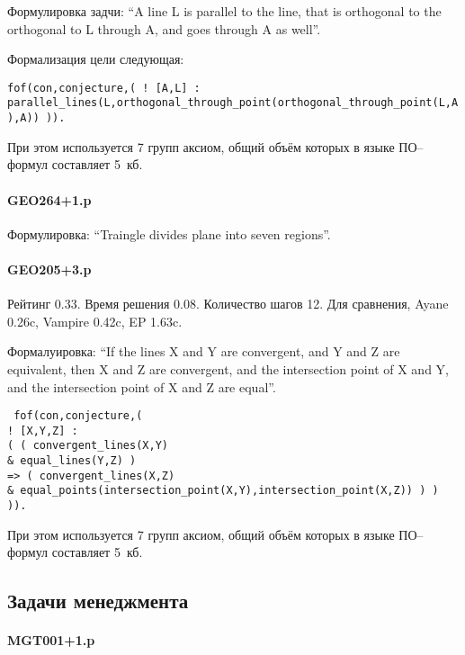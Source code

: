 Формулировка задчи: ``A line L is parallel to the line, that is orthogonal to the orthogonal to L through A, and goes through A as well''.

Формализация цели следующая:

\texttt{fof(con,conjecture,(
    ! [A,L] : parallel\_lines(L,orthogonal\_through\_point(orthogonal\_through\_point(L,A),A)) )).}

При этом используется 7 групп аксиом, общий объём которых в языке ПО--формул составляет 5~кб.

\paragraph{GEO264+1.p}

Формулировка: ``Traingle divides plane into seven regions''.

\paragraph{GEO205+3.p}
Рейтинг 0.33. Время решения 0.08. Количество шагов 12. Для сравнения, Ayane 0.26c, Vampire 0.42c, EP 1.63c.

Формалуировка: ``If the lines X and Y are convergent, and Y and Z are  equivalent, then X and Z are convergent, and the intersection   point of X and Y, and the intersection point of X and Z are equal''.

\texttt{
fof(con,conjecture,(\\
    ! [X,Y,Z] :\\
      ( ( convergent\_lines(X,Y)\\
        \& equal\_lines(Y,Z) )\\
     => ( convergent\_lines(X,Z)\\
        \& equal\_points(intersection\_point(X,Y),intersection\_point(X,Z)) ) ) )).\\}

При этом используется 7 групп аксиом, общий объём которых в языке ПО--формул составляет 5~кб.

\subsection{Задачи менеджмента}

\paragraph{MGT001+1.p}

